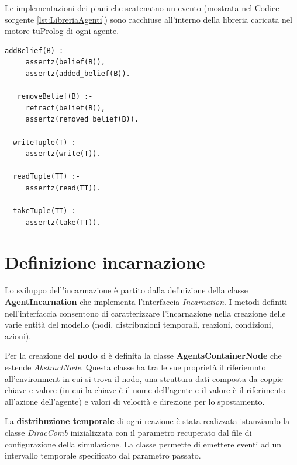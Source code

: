 \documentclass[12pt,a4paper,openright,twoside]{report}
\begin{document}
Le implementazioni dei piani che scatenatno un evento (mostrata nel Codice sorgente \ref{lst:LibreriaAgenti}) sono racchiuse all'interno della libreria caricata nel motore tuProlog di ogni agente.

\medskip
\begin{lstlisting}[firstnumber=1,label={lst:LibreriaAgenti},caption={Libreria agenti}]
   addBelief(B) :-
     assertz(belief(B)),
     assertz(added_belief(B)).

   removeBelief(B) :-
     retract(belief(B)),
     assertz(removed_belief(B)).

  writeTuple(T) :-
     assertz(write(T)).

  readTuple(TT) :-
     assertz(read(TT)).

  takeTuple(TT) :-
     assertz(take(TT)).
\end{lstlisting}

\section{Definizione incarnazione}
Lo sviluppo dell'incarmazione \`e partito dalla definizione della classe \textbf{AgentIncarnation} che implementa l'interfaccia \textit{Incarnation}. I metodi definiti nell'interfaccia consentono di caratterizzare l'incarnazione nella creazione delle varie entit\`a del modello (nodi, distribuzioni temporali, reazioni, condizioni, azioni).

Per la creazione del \textbf{nodo} si \`e definita la classe \textbf{AgentsContainerNode} che estende \textit{AbstractNode}. Questa classe ha tra le sue propriet\`a il riferiemnto all'environment in cui si trova il nodo, una struttura dati composta da coppie chiave e valore (in cui la chiave \`e il nome dell'agente e il valore \`e il riferimento all'azione dell'agente) e valori di velocit\`a e direzione per lo spostamento.

La \textbf{distribuzione temporale} di ogni reazione \`e stata realizzata istanziando la classe \textit{DiracComb} inizializzata con il parametro recuperato dal file di configurazione della simulazione. La classe permette di emettere eventi ad un intervallo temporale specificato dal parametro passato.
\end{document}

